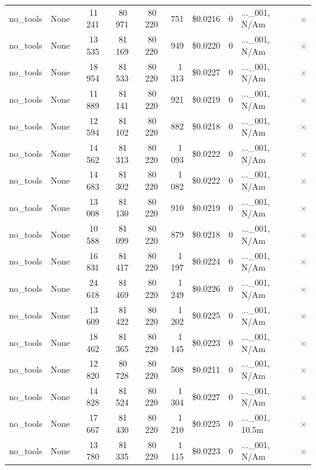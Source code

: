 \documentclass[a4paper,11pt]{article}
\begin{document}
\begin{table}[H]
{\begin{tabular}{l r r r r r r r l c}
no\_tools & None & 11\,241 & 80\,971 & 80\,220 & 751 & \$0.0216 & 0 & ...\_001, N/Am & \textcolor{red}{\(\times\)} \\
no\_tools & None & 13\,535 & 81\,169 & 80\,220 & 949 & \$0.0220 & 0 & ...\_001, N/Am & \textcolor{red}{\(\times\)} \\
no\_tools & None & 18\,954 & 81\,533 & 80\,220 & 1\,313 & \$0.0227 & 0 & ...\_001, N/Am & \textcolor{red}{\(\times\)} \\
no\_tools & None & 11\,889 & 81\,141 & 80\,220 & 921 & \$0.0219 & 0 & ...\_001, N/Am & \textcolor{red}{\(\times\)} \\
no\_tools & None & 12\,594 & 81\,102 & 80\,220 & 882 & \$0.0218 & 0 & ...\_001, N/Am & \textcolor{red}{\(\times\)} \\
no\_tools & None & 14\,562 & 81\,313 & 80\,220 & 1\,093 & \$0.0222 & 0 & ...\_001, N/Am & \textcolor{red}{\(\times\)} \\
no\_tools & None & 14\,683 & 81\,302 & 80\,220 & 1\,082 & \$0.0222 & 0 & ...\_001, N/Am & \textcolor{red}{\(\times\)} \\
no\_tools & None & 13\,008 & 81\,130 & 80\,220 & 910 & \$0.0219 & 0 & ...\_001, N/Am & \textcolor{red}{\(\times\)} \\
no\_tools & None & 10\,588 & 81\,099 & 80\,220 & 879 & \$0.0218 & 0 & ...\_001, N/Am & \textcolor{red}{\(\times\)} \\
no\_tools & None & 16\,831 & 81\,417 & 80\,220 & 1\,197 & \$0.0224 & 0 & ...\_001, N/Am & \textcolor{red}{\(\times\)} \\
no\_tools & None & 24\,618 & 81\,469 & 80\,220 & 1\,249 & \$0.0226 & 0 & ...\_001, N/Am & \textcolor{red}{\(\times\)} \\
no\_tools & None & 13\,609 & 81\,422 & 80\,220 & 1\,202 & \$0.0225 & 0 & ...\_001, N/Am & \textcolor{red}{\(\times\)} \\
no\_tools & None & 18\,462 & 81\,365 & 80\,220 & 1\,145 & \$0.0223 & 0 & ...\_001, N/Am & \textcolor{red}{\(\times\)} \\
no\_tools & None & 12\,820 & 80\,728 & 80\,220 & 508 & \$0.0211 & 0 & ...\_001, N/Am & \textcolor{red}{\(\times\)} \\
no\_tools & None & 14\,828 & 81\,524 & 80\,220 & 1\,304 & \$0.0227 & 0 & ...\_001, N/Am & \textcolor{red}{\(\times\)} \\
no\_tools & None & 17\,667 & 81\,430 & 80\,220 & 1\,210 & \$0.0225 & 0 & ...\_001, 10.5m & \textcolor{red}{\(\times\)} \\
no\_tools & None & 13\,780 & 81\,335 & 80\,220 & 1\,115 & \$0.0223 & 0 & ...\_001, N/Am & \textcolor{red}{\(\times\)} \\

\end{tabular}}
\end{table}
\end{document}

